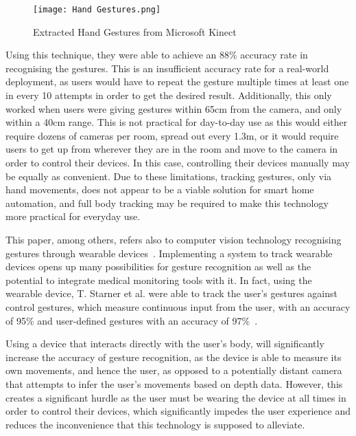 \begin{figure}[!htb]
    \caption{Extracted Hand Gestures from Microsoft Kinect~\protect\cite{Desa17}}
    \centering
    \texttt{[image: Hand Gestures.png]}
    \label{fig:hand_gestures}
\end{figure}

Using this technique, they were able to achieve an 88\% accuracy rate in recognising the gestures.
This is an insufficient accuracy rate for a real-world deployment, as users would have to repeat the gesture multiple times at least one in every 10 attempts in order to get the desired result.
Additionally, this only worked when users were giving gestures within 65cm from the camera, and only within a 40cm range.
This is not practical for day-to-day use as this would either require dozens of cameras per room, spread out every 1.3m, or it would require users to get up from wherever they are in the room and move to the camera in order to control their devices.
In this case, controlling their devices manually may be equally as convenient.
Due to these limitations, tracking gestures, only via hand movements, does not appear to be a viable solution for smart home automation, and full body tracking may be required to make this technology more practical for everyday use.

This paper, among others, refers also to computer vision technology recognising gestures through wearable devices~\cite{Krum00,Star00,Vole22}.
Implementing a system to track wearable devices opens up many possibilities for gesture recognition as well as the potential to integrate medical monitoring tools with it.
In fact, using the wearable device, T. Starner et al. were able to track the user's gestures against control gestures, which measure continuous input from the user, with an accuracy of 95\% and user-defined gestures with an accuracy of 97\%~\cite{Star00}.

Using a device that interacts directly with the user's body, will significantly increase the accuracy of gesture recognition, as the device is able to measure its own movements, and hence the user, as opposed to a potentially distant camera that attempts to infer the user's movements based on depth data.
However, this creates a significant hurdle as the user must be wearing the device at all times in order to control their devices, which significantly impedes the user experience and reduces the inconvenience that this technology is supposed to alleviate.

